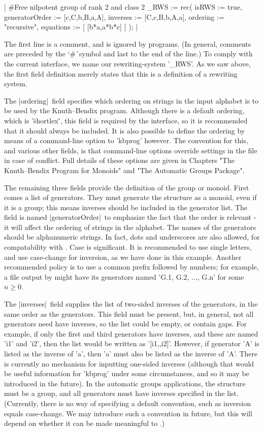 |
#Free nilpotent group of rank 2 and class 2
_RWS := rec(
           isRWS := true,
  generatorOrder := [c,C,b,B,a,A],
        inverses := [C,c,B,b,A,a],
        ordering := "recursive",
       equations := [
         [b*a,a*b*c]
       ]
);
|

The first line is a comment, and is ignored by programs. (In general,
comments are preceded by the `\#\'\ symbol and last to the end of the line.)
To comply with the current {\GAP} interface, we name our rewriting-system
'\_RWS'.
As we saw above, the first field definition merely states that this is a
definition of a rewriting system.

The |ordering|\ field specifies which
ordering on strings in the input alphabet is to be used by the Knuth--Bendix
program. Although there is a default ordering, which is '\"shortlex\"',
this field is required by the {\GAP} interface, so it is recommended that
it should always be included.
It is also possible
to define the ordering by means of a command-line option to 'kbprog'
however. The convention for this, and various other fields, is that
command-line options override settings in the file in case of conflict.
Full details of these options are given in Chapters
"The Knuth--Bendix Program for Monoids" and "The Automatic Groups Package".

The remaining three fields provide the definition of the group or monoid.
First comes a list of generators. They must generate the structure as a monoid,
even if it is a group; this means inverses should be included in the generator
list. The field is named |generatorOrder|\ to emphasize the fact that the
order is relevant - it will affect the ordering of strings in the alphabet.
The names of the generators should be alphanumeric strings. In fact,
dots and underscores are also allowed, for compatability with {\GAP}.
Case is significant. It is recommended to use single letters, and use
case-change for inversion, as we have done in this example. Another
recommended policy is to use a common prefix followed by numbers; for
example, a file output by {\GAP} might have its generators named
'G.1, G.2, ..., G.n' for some $n \ge 0$.

The |inverses|\ field supplies the list of two-sided inverses of the
generators, in the same order as the generators. This field must be present,
but, in general, not all generators need have inverses, so the list could
be empty, or contain gaps. For example, if only the first and third
generators have inverses, and these are named 'i1' and 'i2', then the list
would be written as '[i1,,i2]'.  However, if generator 'A' is listed as the
inverse of 'a', then 'a' must also be listed as the inverse of 'A'.
There is currently no mechanism for inputting one-sided inverses (although
that would be useful information for 'kbprog' under some circumstances, and so
it may be introduced in the future).
In the automatic groups applications, the structure must be a group, and all
generators must have inverses specified in the list.
(Currently, there is no way of specifying a default convention, such as
inversion equals case-change. We may introduce such a convention in
future, but this will depend on whether it can be made meaningful to
{\GAP}.)

